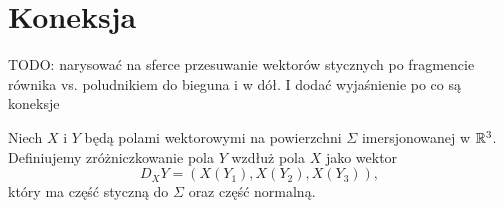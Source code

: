 \section{Koneksja}

{\color{red}TODO: narysować na sferce przesuwanie wektorów stycznych po fragmencie równika vs. poludnikiem do bieguna i w dół. I dodać wyjaśnienie po co są koneksje}

Niech $X$ i $Y$ będą polami wektorowymi na powierzchni $\Sigma$ imersjonowanej w $\mathbb{R}^3$. Definiujemy zróżniczkowanie pola $Y$ wzdłuż pola $X$ jako wektor
$$D_XY=(X(Y_1), X(Y_2), X(Y_3)),$$
który ma część styczną do $\Sigma$ oraz część normalną.




